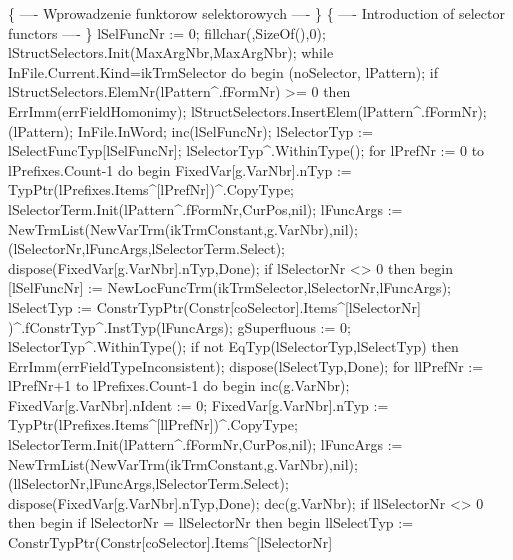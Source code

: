    \{ ---- Wprowadzenie funktorow selektorowych ---- \}
   \{ ---- Introduction of selector functors ---- \}
   lSelFuncNr := 0;
   fillchar(,SizeOf(),0);
   lStructSelectors.Init(MaxArgNbr,MaxArgNbr);
   while InFile.Current.Kind=ikTrmSelector do
   begin
      (noSelector, lPattern);
      if lStructSelectors.ElemNr(lPattern^.fFormNr) >= 0 then
         ErrImm(errFieldHomonimy);
      lStructSelectors.InsertElem(lPattern^.fFormNr);
      (lPattern);
      InFile.InWord;
      inc(lSelFuncNr); lSelectorTyp := lSelectFuncTyp[lSelFuncNr];
      lSelectorTyp^.WithinType();
      for lPrefNr := 0 to lPrefixes.Count-1 do
      begin
         FixedVar[g.VarNbr].nTyp := TypPtr(lPrefixes.Items^[lPrefNr])^.CopyType;
         lSelectorTerm.Init(lPattern^.fFormNr,CurPos,nil);
         lFuncArgs := NewTrmList(NewVarTrm(ikTrmConstant,g.VarNbr),nil);
         (lSelectorNr,lFuncArgs,lSelectorTerm.Select);
         dispose(FixedVar[g.VarNbr].nTyp,Done);
         if lSelectorNr <> 0 then
         begin
            [lSelFuncNr] := NewLocFuncTrm(ikTrmSelector,lSelectorNr,lFuncArgs);
            lSelectTyp := ConstrTypPtr(Constr[coSelector].Items^[lSelectorNr]
                                      )^.fConstrTyp^.InstTyp(lFuncArgs);
            gSuperfluous := 0;
            lSelectorTyp^.WithinType();
            if not EqTyp(lSelectorTyp,lSelectTyp) then
               ErrImm(errFieldTypeInconsistent);
            dispose(lSelectTyp,Done);
            for llPrefNr := lPrefNr+1 to lPrefixes.Count-1 do
            begin
               inc(g.VarNbr);
               FixedVar[g.VarNbr].nIdent := 0;
               FixedVar[g.VarNbr].nTyp := TypPtr(lPrefixes.Items^[llPrefNr])^.CopyType;
               lSelectorTerm.Init(lPattern^.fFormNr,CurPos,nil);
               lFuncArgs := NewTrmList(NewVarTrm(ikTrmConstant,g.VarNbr),nil);
               (llSelectorNr,lFuncArgs,lSelectorTerm.Select);
               dispose(FixedVar[g.VarNbr].nTyp,Done);
               dec(g.VarNbr);
               if llSelectorNr <> 0 then
               begin
                  if lSelectorNr = llSelectorNr then
                  begin
                     llSelectTyp := ConstrTypPtr(Constr[coSelector].Items^[lSelectorNr]
